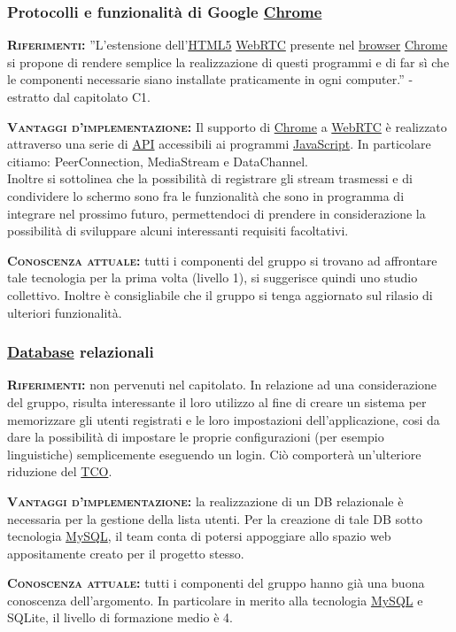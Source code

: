 \subsubsection{Protocolli e funzionalità di Google \underline{Chrome}}
\begin{description}
	\item{\scshape\bfseries Riferimenti:}
  ''L'estensione dell'\underline{HTML5} \underline{WebRTC} presente nel \underline{browser} \underline{Chrome} si propone di rendere semplice la realizzazione di questi programmi e di far sì che le componenti necessarie siano installate praticamente in ogni computer.'' - estratto dal capitolato C1.
  
 	\item{\scshape\bfseries Vantaggi d'implementazione:} Il supporto di \underline{Chrome} a \underline{WebRTC} è realizzato attraverso una serie di \underline{API} accessibili ai programmi \underline{JavaScript}. In particolare citiamo: PeerConnection, MediaStream e DataChannel.\\Inoltre si sottolinea che la possibilità di registrare gli stream trasmessi e di condividere lo schermo sono fra le funzionalità che sono in programma di integrare nel prossimo futuro, permettendoci di prendere in considerazione la possibilità di sviluppare alcuni interessanti requisiti facoltativi.
	
	\item{\scshape\bfseries Conoscenza attuale:} tutti i componenti del gruppo si trovano ad affrontare tale tecnologia per la prima volta (livello 1), si suggerisce quindi uno studio collettivo. Inoltre è consigliabile che il gruppo si tenga aggiornato sul rilasio di ulteriori funzionalità.
\end{description}

\subsubsection{\underline{Database} relazionali}
\begin{description}
	\item{\scshape\bfseries Riferimenti:} non pervenuti nel capitolato. In relazione ad una considerazione del gruppo, risulta interessante il loro utilizzo al fine di creare un sistema per memorizzare gli utenti registrati e le loro impostazioni dell'applicazione, cosi da dare la possibilità di impostare le proprie configurazioni (per esempio linguistiche) semplicemente eseguendo un login. Ciò comporterà un'ulteriore riduzione del \underline{TCO}.
  
 	\item{\scshape\bfseries Vantaggi d'implementazione:} la realizzazione di un DB relazionale è necessaria per la gestione della lista utenti. Per la creazione di tale DB sotto tecnologia \underline{MySQL}, il team conta di potersi appoggiare allo spazio web appositamente creato per il progetto stesso.
	
	\item{\scshape\bfseries Conoscenza attuale:} tutti i componenti del gruppo hanno già una buona conoscenza dell'argomento. In particolare in merito alla tecnologia \underline{MySQL} e SQLite, il livello di formazione medio è 4.
\end{description}

